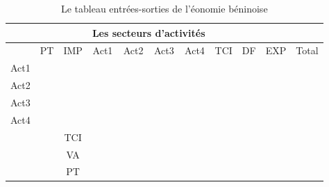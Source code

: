 \documentclass[10pt,a4paper]{article}
\begin{document}
\begin{table}[h!]
\begin{center}
\begin{tabular}{|c|c|c|c|c|c|c|c|c|c|c|}\cline{4-7}
\multicolumn{2}{c}{}&&\multicolumn{4}{|c|}{Les secteurs d'activités}&\multicolumn{2}{c}{}\\\hline
\multicolumn{1}{|c|}{}&PT&IMP&Act1&Act2&Act3&Act4&TCI&DF&EXP&Total\\
\multicolumn{1}{|c|}{Act1}&&&&&&&&&&\\\hline
Act2&&&&&&&&&&\\\hline
Act3&&&&&&&&&&\\\hline
Act4&&&&&&&&&&\\\hline
\multicolumn{2}{c|}{}&TCI&&&&&\multicolumn{2}{c}{}\\\cline{3-7}
\multicolumn{2}{c|}{}&VA&&&&&\multicolumn{2}{c}{}\\\cline{3-7}
\multicolumn{2}{c|}{}&PT&&&&&\multicolumn{2}{c}{}\\\cline{3-7}
\end{tabular}
\caption{Le tableau entrées-sorties de l'éonomie béninoise}
\end{center}
\end{table}
\end{document}
